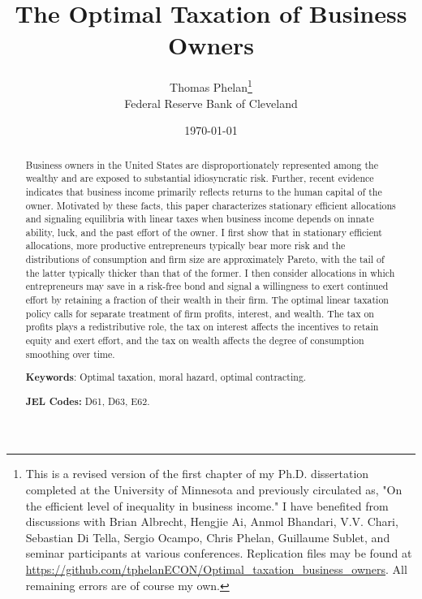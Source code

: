 \documentclass[11pt]{article}
\theoremstyle{plain}
\begin{document}
\title{The Optimal Taxation of Business Owners}
\date{\today} 
\author{Thomas Phelan\thanks{This is a revised version of the first chapter of my Ph.D. dissertation completed at the University of Minnesota and previously circulated as, "On the efficient level of inequality in business income." I have benefited from discussions with Brian Albrecht, Hengjie Ai, Anmol Bhandari, V.V. Chari, Sebastian Di Tella, Sergio Ocampo, Chris Phelan, Guillaume Sublet, and seminar participants at various conferences. Replication files may be found at \href{https://github.com/tphelanECON/Optimal_taxation_business_owners}{https://github.com/tphelanECON/Optimal\_taxation\_business\_owners}. All remaining errors are of course my own.} \\ Federal Reserve Bank of Cleveland}

\maketitle

\begin{abstract} 
Business owners in the United States are disproportionately represented among the wealthy and are exposed to substantial idiosyncratic risk. Further, recent evidence indicates that business income primarily reflects returns to the human capital of the owner. Motivated by these facts, this paper characterizes stationary efficient allocations and signaling equilibria with linear taxes when business income depends on innate ability, luck, and the past effort of the owner. I first show that in stationary efficient allocations, more productive entrepreneurs typically bear more risk and the distributions of consumption and firm size are approximately Pareto, with the tail of the latter typically thicker than that of the former. I then consider allocations in which entrepreneurs may save in a risk-free bond and signal a willingness to exert continued effort by retaining a fraction of their wealth in their firm. The optimal linear taxation policy calls for separate treatment of firm profits, interest, and wealth. The tax on profits plays a redistributive role, the tax on interest affects the incentives to retain equity and exert effort, and the tax on wealth affects the degree of consumption smoothing over time.  

\smallskip

\textbf{Keywords}: Optimal taxation, moral hazard, optimal contracting.

\smallskip

\textbf{JEL Codes:} D61, D63, E62.

\end{abstract}
\end{document}
